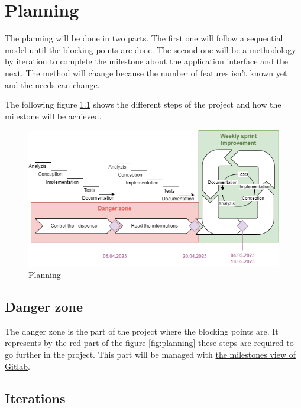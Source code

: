 \chapter{Planning}
\label{chap:planning}

The planning will be done in two parts.
The first one will follow a sequential model until the blocking points are done.
The second one will be a methodology by iteration to complete the milestone about the application interface and the next.
The method will change because the number of features isn't known yet and the needs can change.

The following figure \ref{fig:planning1} shows the different steps of the project and how the milestone will be achieved.

\begin{figure}[ht]
    \centering
    \includegraphics[width=1\textwidth]{img/planning.drawio.png}
    \caption{Planning}
    \label{fig:planning1}
\end{figure}

\section{Danger zone}
\label{sec:planning:danger}

The danger zone is the part of the project where the blocking points are.
It represents by the red part of the figure \ref{fig:planning} these steps are required to go further in the project.
This part will be managed with \href{https://gitlab.forge.hefr.ch/ps6-2223-microdoser/ps6-2223-microdoser/-/milestones/3#tab-issues}{the milestones view of Gitlab}.

\section{Iterations}
\label{sec:planning:iterations}

